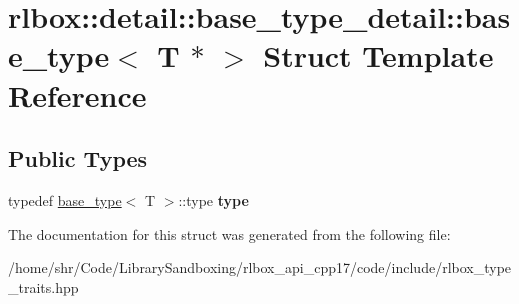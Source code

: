 \hypertarget{structrlbox_1_1detail_1_1base__type__detail_1_1base__type_3_01T_01_5_01_4}{}\section{rlbox\+:\+:detail\+:\+:base\+\_\+type\+\_\+detail\+:\+:base\+\_\+type$<$ T $\ast$ $>$ Struct Template Reference}
\label{structrlbox_1_1detail_1_1base__type__detail_1_1base__type_3_01T_01_5_01_4}
\subsection*{Public Types}
\begin{DoxyCompactItemize}
\item 
\mbox{\label{structrlbox_1_1detail_1_1base__type__detail_1_1base__type_3_01T_01_5_01_4_a887e34c81c8f29a04ee6247929ac4699}} 
typedef \hyperlink{structrlbox_1_1detail_1_1base__type__detail_1_1base__type}{base\+\_\+type}$<$ T $>$\+::type {\bfseries type}
\end{DoxyCompactItemize}


The documentation for this struct was generated from the following file\+:\begin{DoxyCompactItemize}
\item 
/home/shr/\+Code/\+Library\+Sandboxing/rlbox\+\_\+api\+\_\+cpp17/code/include/rlbox\+\_\+type\+\_\+traits.\+hpp\end{DoxyCompactItemize}
